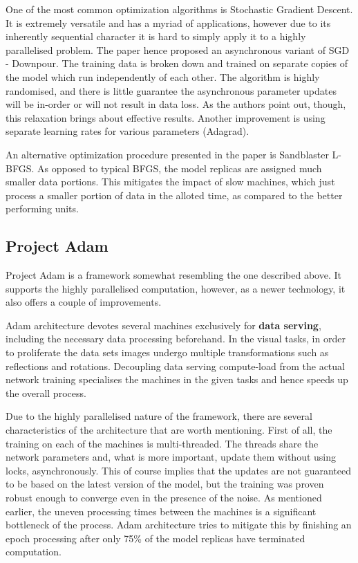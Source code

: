 \documentclass[a4paper, 12pt]{article}
\numberwithin{equation}{section}
\begin{document}
	One of the most common optimization algorithms is Stochastic Gradient Descent. It is extremely versatile and has a myriad of applications, however due to its inherently sequential character it is hard to simply apply it to a highly parallelised problem. The paper hence proposed an asynchronous variant of SGD - Downpour. The training data is broken down and trained on separate copies of the model which run independently of each other. The algorithm is highly randomised, and there is little guarantee the asynchronous parameter updates will be in-order or will not result in data loss. As the authors point out, though, this relaxation brings about effective results. Another improvement is using separate learning rates for various parameters (Adagrad).

	An alternative optimization procedure presented in the paper is Sandblaster L-BFGS. As opposed to typical BFGS, the model replicas are assigned much smaller data portions. This mitigates the impact of slow machines, which just process a smaller portion of data in the alloted time, as compared to the better performing units.

	\subsection{Project Adam}

	Project Adam is a framework somewhat resembling the one described above. It supports the highly parallelised computation, however, as a newer technology, it also offers a couple of improvements.

	Adam architecture devotes several machines exclusively for \textbf{data serving}, including the necessary data processing beforehand. In the visual tasks, in order to proliferate the data sets images undergo multiple transformations such as reflections and rotations. Decoupling data serving compute-load from the actual network training specialises the machines in the given tasks and hence speeds up the overall process.

	Due to the highly parallelised nature of the framework, there are several characteristics of the architecture that are worth mentioning. First of all, the training on each of the machines is multi-threaded. The threads share the network parameters and, what is more important, update them without using locks, asynchronously. This of course implies that the updates are not guaranteed to be based on the latest version of the model, but the training was proven robust enough to converge even in the presence of the noise. As mentioned earlier, the uneven processing times between the machines is a significant bottleneck of the process. Adam architecture tries to mitigate this by finishing an epoch processing after only 75\% of the model replicas have terminated computation.
\end{document}
